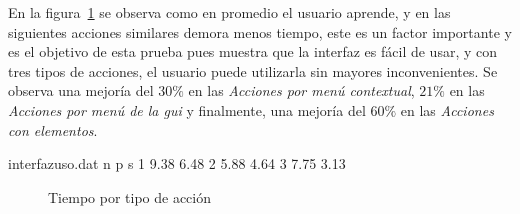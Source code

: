 En la figura~\ref{fig:interfaz_tiempo_acciones} se observa como en promedio el
usuario aprende, y en las siguientes acciones similares demora menos tiempo,
este es un factor importante y es el objetivo de esta prueba pues muestra que la
interfaz es fácil de usar, y con tres tipos de acciones, el usuario puede
utilizarla sin mayores inconvenientes. Se observa una mejoría del $30\%$ en las
\emph{Acciones por menú contextual}, $21\%$ en las \emph{Acciones por menú de la
    \Gls{gui}} y finalmente, una mejoría del $60\%$ en las \emph{Acciones con elementos}.


\begin{filecontents}{interfazuso.dat}
n   p       s
1	9.38	6.48
2   5.88	4.64
3   7.75	3.13
\end{filecontents}

\begin{figure}[H]
    
        \centering
        \caption{Tiempo por tipo de acción}
        \label{fig:interfaz_tiempo_acciones}
\end{figure}

